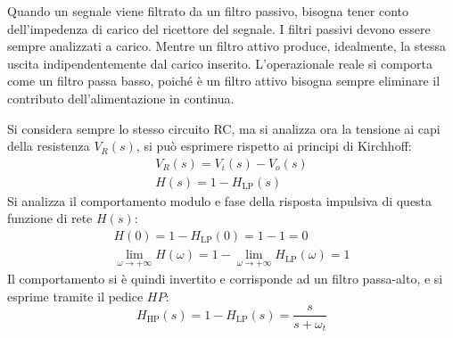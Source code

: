 \documentclass{article}
\numberwithin{equation}{subsection}
\begin{document}
Quando un segnale viene filtrato da un filtro passivo, bisogna tener conto dell'impedenza di carico del ricettore del segnale. I filtri passivi devono essere sempre 
analizzati a carico. Mentre un filtro attivo produce, idealmente, la stessa uscita indipendentemente dal carico inserito. L'operazionale reale si comporta come un 
filtro passa basso, poiché è un filtro attivo bisogna sempre eliminare il contributo dell'alimentazione in continua. 

Si considera sempre lo stesso circuito RC, ma si analizza ora la tensione ai capi della resistenza $V_R(s)$, si può esprimere rispetto ai principi di Kirchhoff:
\begin{gather*}
    V_R(s)=V_i(s)-V_o(s)\\
    H(s)=1-H_{\mathrm{LP}}(s)
\end{gather*}
Si analizza il comportamento modulo e fase della risposta impulsiva di questa funzione di rete $H(s)$: 
\begin{gather*}
    H(0)=1-H_{\mathrm{LP}}(0)=1-1=0\\
    \lim_{\omega\to+\infty}H(\omega)=1-\lim_{\omega\to+\infty}H_{\mathrm{LP}}(\omega)=1
\end{gather*}
Il comportamento si è quindi invertito e corrisponde ad un filtro passa-alto, e si esprime tramite il pedice $HP$:
\begin{equation}
    H_{\mathrm{HP}}(s)=1-H_{\mathrm{LP}}(s)=\displaystyle\frac{s}{s+\omega_t}
\end{equation}
\end{document}
